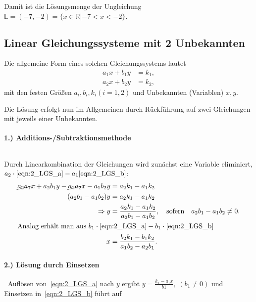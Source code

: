 Damit ist die Lösungsmenge der Ungleichung $\mathbb{L} = (-7,-2) = \{x\in \mathbb{R}|-7 < x<-2\}$.


\subsection{Linear Gleichungssysteme mit 2 Unbekannten}

Die allgemeine Form eines solchen Gleichungssystems lautet 
\begin{subequations}
\begin{align}
        a_1 x + b_1 y &= k_1, \label{eqn:2_LGS_a}\\
        a_2 x + b_2 y &= k_2,\label{eqn:2_LGS_b}
    \end{align}
\end{subequations}
mit den festen Größen $a_i, b_i, k_i (i=1,2)$ und Unbekannten (Variablen) $x,y$.

Die Lösung erfolgt nun im Allgemeinen durch Rückführung auf zwei Gleichungen mit jeweils einer Unbekannten. 

\paragraph{1.) Additions-/Subtraktionsmethode}$~$

Durch Linearkombination der Gleichungen wird zunächst eine Variable eliminiert, $a_2 \cdot \eqref{eqn:2_LGS_a} - a_1 \eqref{eqn:2_LGS_b}$: 
\begin{align}
    \cancel{a_2 a_1 x} + a_2 b_1 y - \cancel{a_1a_2 x} - a_1 b_2 y &= a_2 k_1 -a_1 k_2 \notag \\
    (a_2 b_1 -a_1 b_2) y &= a_2 k_1 - a_1 k_2 \notag \\
    \Rightarrow y &= \frac{a_2 k_1 - a_1 k_2}{a_2 b_1 - a_1 b_2}, \qq{sofern} a_2 b_1 - a_1 b_2 \neq 0.\\
\intertext{Analog erhält man aus $b_1\cdot \eqref{eqn:2_LGS_a} - b_1 \cdot \eqref{eqn:2_LGS_b}$}
    x &= \frac{b_2 k_1 - b_1 k_2}{a_1 b_2 -a_2 b_1}.
\end{align}

\paragraph{2.) Lösung durch Einsetzen}$~$
Auflösen von~\eqref{eqn:2_LGS_a} nach $y$ ergibt $y = \frac{k_1 - a_1 x}{b1}, \; (b_1 \neq 0)$ und Einsetzen in~\eqref{eqn:2_LGS_b} führt auf

